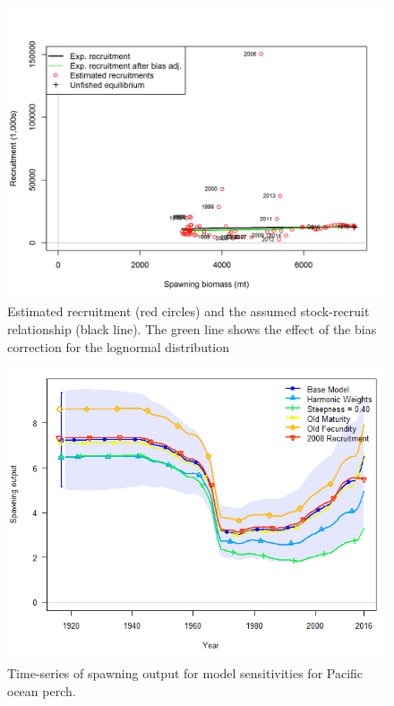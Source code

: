 \documentclass[12pt,]{article}
\begin{document}
\FloatBarrier

\begin{figure}
\centering
\includegraphics{r4ss/plots_mod1/SR_curve2.png}
\caption{Estimated recruitment (red circles) and the assumed
stock-recruit relationship (black line). The green line shows the effect
of the bias correction for the lognormal distribution
\label{fig:stock_recruit_curve}}
\end{figure}

\begin{figure}
\centering
\includegraphics{Figures/ssb_sens1.png}
\caption{Time-series of spawning output for model sensitivities for
Pacific ocean perch. \label{fig:sens1_ssb}}
\end{figure}
\end{document}
